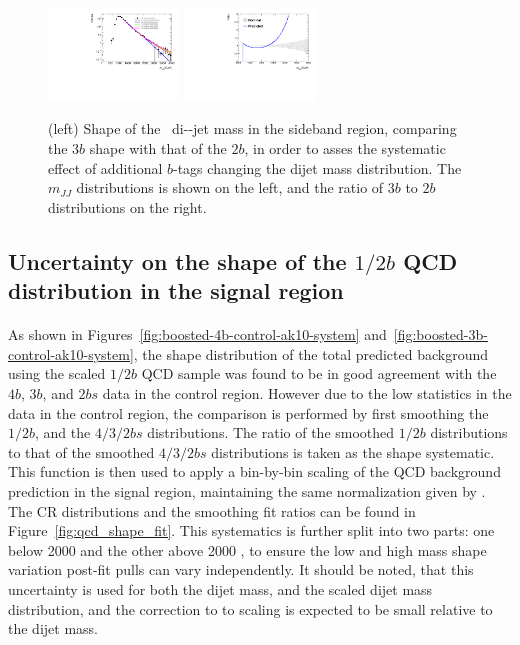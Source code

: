 \begin{figure}[htbp!]
\begin{center} 
\includegraphics[width=0.31\textwidth,angle=-90]{figures/boosted/Syst_Smooth/TopShapeSRSysfitSmooth_sig33_comp22.pdf}
\includegraphics[width=0.31\textwidth,angle=-90]{figures/boosted/Syst_Smooth/TopShapeSRSysfitSmooth_sig33_comp22_ratio.pdf}
\caption{(left)  Shape of the \ttbar\ di-\largeR-jet mass in the sideband region,
comparing the $3b$ shape with that of the $2b$, in order to asses the systematic effect of additional $b$-tags changing the dijet mass distribution.  The $m_{JJ}$ distributions is shown on the left, and the ratio of $3b$ to $2b$ distributions on the right.}
\label{fig:ttbar-shapes-signal}
\end{center}
\end{figure}


\subsection{Uncertainty on the shape of the $1/2b$ QCD distribution in the signal region}
\label{unc-shape-qcd-in-sr}

\paragraph{}
As shown in Figures~\ref{fig:boosted-4b-control-ak10-system} and~\ref{fig:boosted-3b-control-ak10-system}, the shape distribution of the total predicted background using the scaled $1/2b$ QCD sample was found to be in good agreement with the $4b$, $3b$, and $2bs$ data in the control region.  However due to the low statistics in the data in the control region, the comparison is performed by first smoothing the $1/2b$, and the $4/3/2bs$ distributions. The ratio of the smoothed $1/2b$ distributions to that of the smoothed $4/3/2bs$ distributions is taken as the shape systematic. This function is then used to apply a bin-by-bin scaling of the QCD background prediction in the signal region, maintaining the same normalization given by \muqcd.  The CR distributions and the smoothing fit ratios can be found in Figure~\ref{fig:qcd_shape_fit}. This systematics is further split into two parts: one below 2000 \GeV and the other above 2000 \GeV, to ensure the low and high mass shape variation post-fit pulls can vary independently. It should be noted, that this uncertainty is used for both the dijet mass, and the scaled dijet mass distribution, and the correction to to scaling is expected to be small relative to the dijet mass. 

